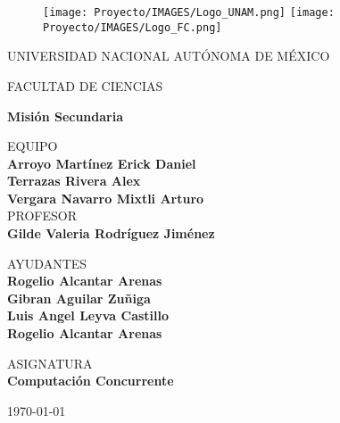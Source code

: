 \documentclass[10pt,letterpaper]{article}
\begin{document}
\thispagestyle{empty}
	
	\begin{figure}[ht]
			\texttt{[image: Proyecto/IMAGES/Logo\_UNAM.png]}
			\label{EscudoUNAM}
	   \endminipage
			\texttt{[image: Proyecto/IMAGES/Logo\_FC.png]}
			\label{EscudoFC}
		\endminipage
	\end{figure}
	
	\begin{center}
	\vspace{0.8cm}
	\LARGE
	UNIVERSIDAD NACIONAL AUTÓNOMA DE MÉXICO 
	
	\vspace{0.8cm}
	\LARGE
	FACULTAD DE CIENCIAS
	
	\vspace{.5cm}	
	\Large
	\textbf{Misión Secundaria}

	\vspace{.7cm}
	\normalsize	
	EQUIPO \\
	\vspace{.3cm}
	\large
	\textbf{Arroyo Martínez Erick Daniel} \\ 
    \textbf{Terrazas Rivera Alex}\\
    \textbf{Vergara Navarro Mixtli Arturo}
	\vspace{.7cm}\\
	\normalsize	
	PROFESOR \\
	\vspace{.3cm}
	\large
	\textbf{Gilde Valeria Rodríguez Jiménez}

    \vspace{.7cm}
	\normalsize	
	AYUDANTES \\
	\vspace{.3cm}
	\large
	\textbf{Rogelio Alcantar Arenas}\\
    \textbf{Gibran Aguilar Zuñiga}\\
    \textbf{Luis Angel Leyva Castillo}\\
    \textbf{Rogelio Alcantar Arenas}
	
	\vspace{.7cm}
	\normalsize	
	ASIGNATURA \\
	\vspace{.3cm}
	\large
	\textbf{Computación Concurrente}
	
	\vspace{.2cm}
	\today
	\end{center}
	\newpage

\end{document}
